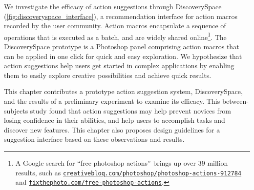 We investigate the efficacy of action suggestions through Discovery\-Space (\autoref{fig:discoveryspace_interface}), a recommendation interface for action macros recorded by the user community. Action macros encapsulate a sequence of operations that is executed as a batch, and are widely shared online\footnote{A Google search for ``free photoshop actions'' brings up over 39 million results, such as \href{https://www.creativebloq.com/photoshop/photoshop-actions-912784}{\nolinkurl{creativebloq.com/photoshop/photoshop-actions-912784}} and \href{https://fixthephoto.com/free-photoshop-actions}{\nolinkurl{fixthephoto.com/free-photoshop-actions}}.}. The Discovery\-Space prototype is a Photoshop panel comprising action macros that can be applied in one click for quick and easy exploration. We hypothesize that action suggestions help users get started in complex applications by enabling them to easily explore creative possibilities and achieve quick results.

This chapter contributes a prototype action suggestion system, Discovery\-Space, and the results of a preliminary experiment to examine its efficacy. This between-subjects study found that action suggestions may help prevent novices from losing confidence in their abilities, and help users to accomplish tasks and discover new features. This chapter also proposes design guidelines for a suggestion interface based on these observations and results.
